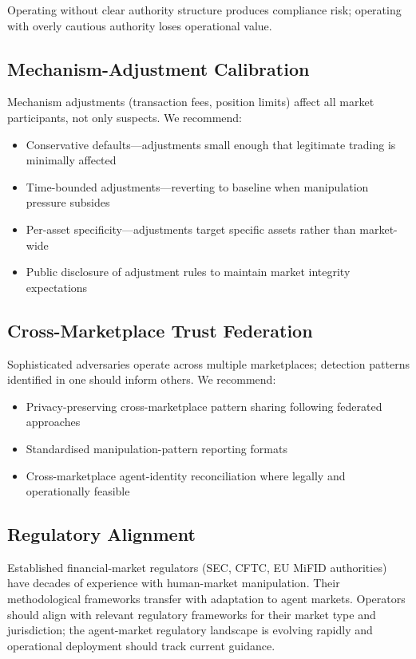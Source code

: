 \documentclass[sigconf,nonacm]{acmart}
\begin{document}
Operating without clear authority structure produces compliance
risk; operating with overly cautious authority loses operational
value.

\subsection{Mechanism-Adjustment Calibration}

Mechanism adjustments (transaction fees, position limits) affect
all market participants, not only suspects. We recommend:

\begin{itemize}
  \item Conservative defaults---adjustments small enough that
        legitimate trading is minimally affected
  \item Time-bounded adjustments---reverting to baseline when
        manipulation pressure subsides
  \item Per-asset specificity---adjustments target specific assets
        rather than market-wide
  \item Public disclosure of adjustment rules to maintain market
        integrity expectations
\end{itemize}

\subsection{Cross-Marketplace Trust Federation}

Sophisticated adversaries operate across multiple marketplaces;
detection patterns identified in one should inform others. We
recommend:

\begin{itemize}
  \item Privacy-preserving cross-marketplace pattern sharing
        following federated approaches~\cite{kairouz2024fedml}
  \item Standardised manipulation-pattern reporting formats
  \item Cross-marketplace agent-identity reconciliation where
        legally and operationally feasible
\end{itemize}

\subsection{Regulatory Alignment}

Established financial-market regulators (SEC, CFTC, EU MiFID
authorities) have decades of experience with human-market
manipulation. Their methodological frameworks transfer with
adaptation to agent markets. Operators should align with
relevant regulatory frameworks for their market type and
jurisdiction; the agent-market regulatory landscape is evolving
rapidly and operational deployment should track current
guidance.
\end{document}
